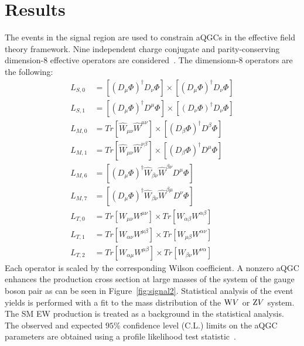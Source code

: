 \section{Results} %
\label{sec:results}
The events in the signal region are used to constrain aQGCs in the effective field theory framework. Nine independent charge conjugate and parity-conserving dimension-8 effective operators are considered~\cite{aqgc_operators}. The dimensionn-8 operators are the following: 
%
\begin{align*}
L_{S,0} &= \left[\left(D_{\mu} \Phi\right)^{\dagger} D_{\nu} \Phi \right] \times \left[\left(D_{\mu} \Phi\right)^{\dagger} D_{\nu} \Phi \right] \\
L_{S,1} &= \left[\left(D_{\mu} \Phi\right)^{\dagger} D^{\mu} \Phi \right] \times \left[\left(D_{\nu} \Phi\right)^{\dagger} D_{\nu} \Phi \right] \\
L_{M,0} &= Tr[\hat{W}_{\mu \nu} \hat{W}^{\mu \nu}] \times \left[ \left(D_{\beta} \Phi\right)^{\dagger} D^{\beta} \Phi \right] \\
L_{M,1} &= Tr[\hat{W}_{\mu \nu} \hat{W}^{\nu \beta}] \times \left[ \left(D_{\beta} \Phi\right)^{\dagger} D^{\mu} \Phi \right] \\
L_{M,6} &= \left[\left(D_{\mu} \Phi\right)^{\dagger}  \hat{W}_{\beta \nu} \hat{W}^{\beta \nu}  D^{\mu} \Phi \right] \\
L_{M,7} &= \left[\left(D_{\mu} \Phi\right)^{\dagger} \hat{W}_{\beta \nu} \hat{W}^{\beta \mu} D^{\nu} \Phi \right ] \\
L_{T,0} &= Tr \left[W_{\mu \nu} W^{\mu \nu} \right] \times Tr \left[W_{\alpha \beta} W^{\alpha \beta} \right] \\
L_{T,1} &= Tr \left[W_{\alpha \nu} W^{\mu \beta} \right] \times Tr \left[W_{\mu \beta} W^{\alpha \nu} \right] \\
L_{T,2} &= Tr \left[W_{\alpha \mu} W^{\mu \beta} \right] \times Tr \left[W_{\beta \nu} W^{\nu \alpha} \right]
\end{align*}
%
Each operator is scaled by the corresponding Wilson coefficient. A nonzero aQGC enhances the production cross section at large masses of the system of the gauge boson pair as can be seen in Figure~\ref{fig:signal2}. Statistical analysis of the event yields is performed with a fit to the mass distribution of the $\mathrm{W} V$ or $\mathrm{Z} V$ system. The SM EW production is treated as a background in the statistical analysis. The observed and expected $95\%$ confidence level (C.L.) limits on the aQGC parameters are obtained using a profile likelihood test statistic~\cite{Junk,Read,Cowan2011}. 


